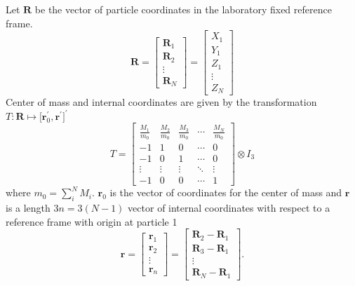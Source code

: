 \documentclass[12pt,doublespace]{article}
\begin{document}
Let $\mathbf{R}$ be the vector of particle coordinates in the laboratory
fixed reference frame. 
\begin{equation}
\mathbf{R=}\left[ 
\begin{array}{c}
\mathbf{R}_{1} \\ 
\mathbf{R}_{2} \\ 
\vdots \\ 
\mathbf{R}_{N}
\end{array}
\right] =\left[ 
\begin{array}{c}
X_{1} \\ 
Y_{1} \\ 
Z_{1} \\ 
\vdots \\ 
Z_{N}
\end{array}
\right]
\end{equation}
Center of mass and internal coordinates are given by the transformation $T:%
\mathbf{R}\mapsto \lbrack \mathbf{r}_{0}^{\prime },\mathbf{r}^{\prime
}]^{\prime }$ 
\begin{equation}
T=\left[ 
\begin{array}{ccccc}
\frac{M_{1}}{m_{0}} & \frac{M_{2}}{m_{0}} & \frac{M_{3}}{m_{0}} & \cdots & 
\frac{M_{N}}{m_{0}} \\ 
-1 & 1 & 0 & \cdots & 0 \\ 
-1 & 0 & 1 & \cdots & 0 \\ 
\vdots & \vdots & \vdots & \ddots & \vdots \\ 
-1 & 0 & 0 & \cdots & 1
\end{array}
\right] \otimes I_{3}  \label{Ttran}
\end{equation}
where $m_{0}=\sum_{i}^{N}M_{i}$. $\mathbf{r}_{0}$ is the vector of
coordinates for the center of mass and $\mathbf{r}$ is a length $3n=3\left(
N-1\right) $ vector of internal coordinates with respect to a reference
frame with origin at particle 1 
\begin{equation}
\mathbf{r=}\left[ 
\begin{array}{c}
\mathbf{r}_{1} \\ 
\mathbf{r}_{2} \\ 
\vdots \\ 
\mathbf{r}_{n}
\end{array}
\right] =\left[ 
\begin{array}{c}
\mathbf{R}_{2}-\mathbf{R}_{1} \\ 
\mathbf{R}_{3}-\mathbf{R}_{1} \\ 
\vdots \\ 
\mathbf{R}_{N}-\mathbf{R}_{1}
\end{array}
\right] .  \label{rdef}
\end{equation}
\end{document}
